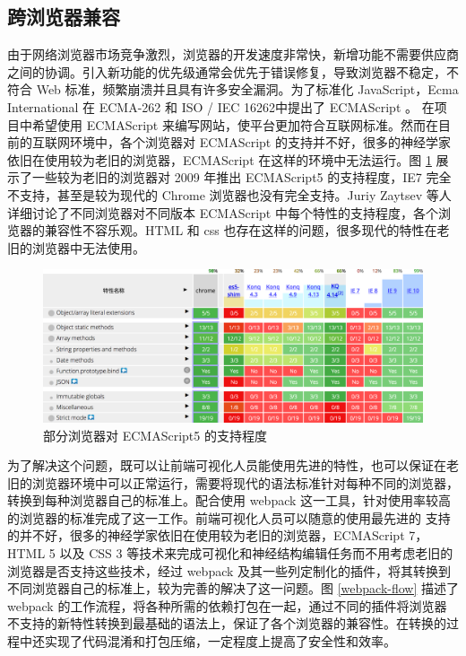 \subsection{跨浏览器兼容}
由于网络浏览器市场竞争激烈，浏览器的开发速度非常快，新增功能不需要供应商之间的协调。引入新功能的优先级通常会优先于错误修复，导致浏览器不稳定，不符合 Web 标准，频繁崩溃并且具有许多安全漏洞。为了标准化 JavaScript，Ecma International 在 ECMA-262 和 ISO / IEC 16262中提出了 ECMAScript 。 在项目中希望使用 ECMAScript 来编写网站，使平台更加符合互联网标准。然而在目前的互联网环境中，各个浏览器对 ECMAScript 的支持并不好，很多的神经学家依旧在使用较为老旧的浏览器，ECMAScript 在这样的环境中无法运行。图 \ref{es5} 展示了一些较为老旧的浏览器对 2009 年推出 ECMAScript5 的支持程度，IE7 完全不支持，甚至是较为现代的 Chrome 浏览器也没有完全支持。Juriy Zaytsev 等人详细讨论了不同浏览器对不同版本 ECMAScript 中每个特性的支持程度，各个浏览器的兼容性不容乐观。HTML 和 css 也存在这样的问题，很多现代的特性在老旧的浏览器中无法使用。

\begin{figure}
\centering
\includegraphics[width=148mm]{images/es5}
\caption{部分浏览器对 ECMAScript5 的支持程度}
\label{es5}
\end{figure}

为了解决这个问题，既可以让前端可视化人员能使用先进的特性，也可以保证在老旧的浏览器环境中可以正常运行，需要将现代的语法标准针对每种不同的浏览器，转换到每种浏览器自己的标准上。配合使用 webpack 这一工具，针对使用率较高的浏览器的标准完成了这一工作。前端可视化人员可以随意的使用最先进的 支持的并不好，很多的神经学家依旧在使用较为老旧的浏览器，ECMAScript 7，HTML 5 以及 CSS 3 等技术来完成可视化和神经结构编辑任务而不用考虑老旧的浏览器是否支持这些技术，经过 webpack 及其一些列定制化的插件，将其转换到不同浏览器自己的标准上，较为完善的解决了这一问题。图 \ref{webpack-flow} 描述了 webpack 的工作流程，将各种所需的依赖打包在一起，通过不同的插件将浏览器不支持的新特性转换到最基础的语法上，保证了各个浏览器的兼容性。在转换的过程中还实现了代码混淆和打包压缩，一定程度上提高了安全性和效率。

